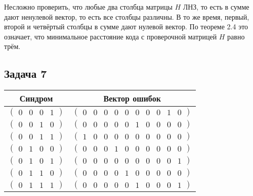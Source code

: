\documentclass{article}
\begin{document}
Несложно проверить, что любые два столбца матрицы $H$ ЛНЗ, то есть в сумме дают
ненулевой вектор, то есть все столбцы различны.
В то же время, первый, второй и четвёртый столбцы в сумме дают нулевой вектор.
По теореме 2.4 это означает, что минимальное расстояние кода с проверочной
матрицей $H$ равно трём.

\subsection{\texorpdfstring{Задача 7}{Task 7}}
\begin{table}[h]
    \centering
    \begin{tabular}{c c} \toprule
        Синдром & Вектор ошибок \\ \midrule
        $\begin{pmatrix}0&0&0&1\end{pmatrix}$&$\begin{pmatrix}0&0&0&0&0&0&0&0&1&0\end{pmatrix}$\\
        $\begin{pmatrix}0&0&1&0\end{pmatrix}$&$\begin{pmatrix}0&0&0&0&0&1&0&0&0&0\end{pmatrix}$\\
        $\begin{pmatrix}0&0&1&1\end{pmatrix}$&$\begin{pmatrix}1&0&0&0&0&0&0&0&0&0\end{pmatrix}$\\
        $\begin{pmatrix}0&1&0&0\end{pmatrix}$&$\begin{pmatrix}0&0&0&1&0&0&0&0&0&0\end{pmatrix}$\\
        $\begin{pmatrix}0&1&0&1\end{pmatrix}$&$\begin{pmatrix}0&0&0&0&0&0&0&0&0&1\end{pmatrix}$\\
        $\begin{pmatrix}0&1&1&0\end{pmatrix}$&$\begin{pmatrix}0&0&0&0&1&0&0&0&0&0\end{pmatrix}$\\
        $\begin{pmatrix}0&1&1&1\end{pmatrix}$&$\begin{pmatrix}0&0&0&0&0&1&0&0&0&1\end{pmatrix}$\\

\end{tabular}
\end{table}
\end{document}
